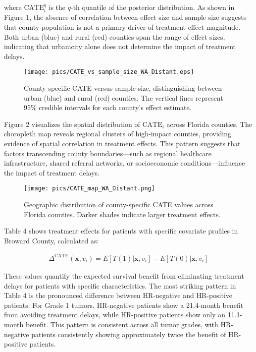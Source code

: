 \documentclass[useAMS,referee]{biom}
\begin{document}
where $\text{CATE}_i^{q}$ is the $q$-th quantile of the posterior distribution. As shown in Figure 1, the absence of correlation between effect size and sample size suggests that county population is not a primary driver of treatment effect magnitude. Both urban (blue) and rural (red) counties span the range of effect sizes, indicating that urbanicity alone does not determine the impact of treatment delays.

\begin{figure}[ht]
\centering
\texttt{[image: pics/CATE\_vs\_sample\_size\_WA\_Distant.eps]}
\caption{County-specific CATE versus sample size, distinguishing between urban (blue) and rural (red) counties. The vertical lines represent 95\% credible intervals for each county's effect estimate.}
\end{figure}

Figure 2 visualizes the spatial distribution of $\text{CATE}_i$ across Florida counties. The choropleth map reveals regional clusters of high-impact counties, providing evidence of spatial correlation in treatment effects. This pattern suggests that factors transcending county boundaries—such as regional healthcare infrastructure, shared referral networks, or socioeconomic conditions—influence the impact of treatment delays.

\begin{figure}[ht]
\centering
\texttt{[image: pics/CATE\_map\_WA\_Distant.png]}
\caption{Geographic distribution of county-specific CATE values across Florida counties. Darker shades indicate larger treatment effects.}
\end{figure}

Table 4 shows treatment effects for patients with specific covariate profiles in Broward County, calculated as:

\begin{align}
\Delta^{\text{CATE}}(\mathbf{x}, v_i) = E[T(1) | \mathbf{x}, v_i] - E[T(0) | \mathbf{x}, v_i]
\end{align}

These values quantify the expected survival benefit from eliminating treatment delays for patients with specific characteristics. The most striking pattern in Table 4 is the pronounced difference between HR-negative and HR-positive patients. For Grade 1 tumors, HR-negative patients show a 21.4-month benefit from avoiding treatment delays, while HR-positive patients show only an 11.1-month benefit. This pattern is consistent across all tumor grades, with HR-negative patients consistently showing approximately twice the benefit of HR-positive patients.
\end{document}
